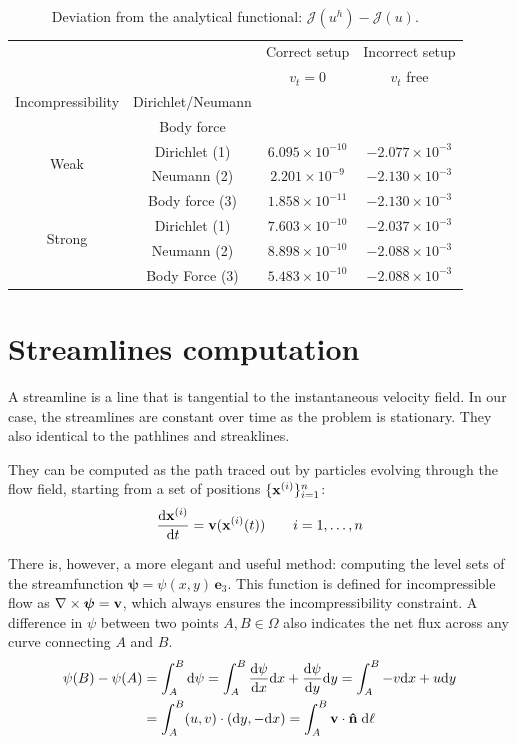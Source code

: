 \documentclass[11 pt]{report}
\begin{document}
\begin{table}[H]
    \centering
    \begin{tabular}[t]{cccc}
        \toprule
         & & Correct setup & Incorrect setup\\
         & & $v_t=0$ & $v_t$ free\\
        Incompressibility & Dirichlet/Neumann & & \\
         & Body force & & \\
        \midrule
        \multirow{2}{*}{Weak} & Dirichlet (1) & $6.095 \times 10^{-10}$ &  $-2.077 \times 10^{-3}$\\
         & Neumann (2) & $2.201 \times 10^{-9}$ &  $-2.130 \times 10^{-3}$\\
         & Body force (3) & $1.858 \times 10^{-11}$ & $-2.130 \times 10^{-3}$\\[4pt]
        \multirow{2}{*}{Strong} & Dirichlet (1) & $7.603 \times 10^{-10}$ &  $-2.037 \times 10^{-3}$\\
         & Neumann (2) & $8.898 \times 10^{-10}$ &  $-2.088 \times 10^{-3}$\\
         & Body Force (3) & $5.483 \times 10^{-10}$ & $-2.088 \times 10^{-3}$\\
        \bottomrule
    \end{tabular}
    \caption{Deviation from the analytical functional: $\mathcal{J}(u^h) - \mathcal{J}(u)$.}
    \label{tab:setups_compare}
\end{table}%


\section{Streamlines computation}
A streamline is a line that is tangential to the instantaneous velocity field. In our case, the streamlines are constant over time as the problem is stationary. They also identical to the pathlines and streaklines.

They can be computed as the path traced out by particles evolving through the flow field, starting from a set of positions $\{\mathbf{x}^{(i)}\}_{i=1}^n$:
\begin{equation}
    \dv{\mathbf{x}^{(i)}}{t} = \mathbf{v}(\mathbf{x}^{(i)}(t)) \qquad i=1, \dots, n
\end{equation}

There is, however, a more elegant and useful method: computing the level sets of the streamfunction $\boldsymbol{\psi} = \psi(x,y)\,\mathbf{e}_3$. This function is defined for incompressible flow as $\nabla \times \boldsymbol\psi = \mathbf{v}$, which always ensures the incompressibility constraint. A difference in $\psi$ between two points $A,B\in \Omega$ also indicates the net flux across any curve connecting $A$ and $B$.
\begin{equation}
    \begin{aligned}
        \psi(B) - \psi(A) &= \int_{A}^B \dd \psi = \int_{A}^B \dv{\psi}{x} \dd x + \dv{\psi}{y} \dd y = \int_{A}^B -v \dd x + u \dd y\\
        &= \int_{A}^B (u, v)\cdot (\dd y, -\dd x) = \int_{A}^B \mathbf{v} \cdot \mathbf{\hat n} \;\dd\ell
    \end{aligned}
\end{equation}
\end{document}
